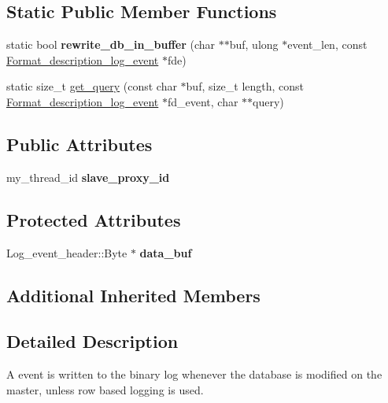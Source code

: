 \subsection*{Static Public Member Functions}
\begin{DoxyCompactItemize}
\item 
\mbox{\label{classQuery__log__event_ac10c7f4266d762e17a3b9869a650c47f}} 
static bool {\bfseries rewrite\+\_\+db\+\_\+in\+\_\+buffer} (char $\ast$$\ast$buf, ulong $\ast$event\+\_\+len, const \mbox{\hyperlink{classFormat__description__log__event}{Format\+\_\+description\+\_\+log\+\_\+event}} $\ast$fde)
\item 
static size\+\_\+t \mbox{\hyperlink{classQuery__log__event_afde3125ae01398ecb57c7c14282959f4}{get\+\_\+query}} (const char $\ast$buf, size\+\_\+t length, const \mbox{\hyperlink{classFormat__description__log__event}{Format\+\_\+description\+\_\+log\+\_\+event}} $\ast$fd\+\_\+event, char $\ast$$\ast$query)
\end{DoxyCompactItemize}
\subsection*{Public Attributes}
\begin{DoxyCompactItemize}
\item 
\mbox{\label{classQuery__log__event_a5300528bde78ce5095beea7781e32b73}} 
my\+\_\+thread\+\_\+id {\bfseries slave\+\_\+proxy\+\_\+id}
\end{DoxyCompactItemize}
\subsection*{Protected Attributes}
\begin{DoxyCompactItemize}
\item 
\mbox{\label{classQuery__log__event_ad901ebfcf01edc91bd16fddd685d3d57}} 
Log\+\_\+event\+\_\+header\+::\+Byte $\ast$ {\bfseries data\+\_\+buf}
\end{DoxyCompactItemize}
\subsection*{Additional Inherited Members}


\subsection{Detailed Description}
A  event is written to the binary log whenever the database is modified on the master, unless row based logging is used.

